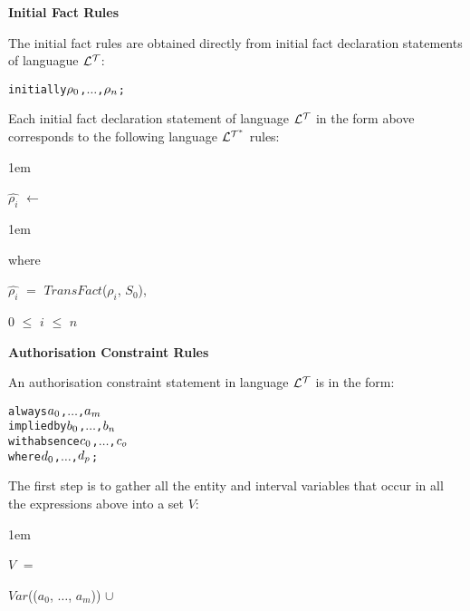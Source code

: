 \documentclass[11pt]{report}
\newenvironment{vverbatim}
{
  \begin{alltt}
}
{
  \vspace{-\baselineskip}
  \end{alltt}
}
\newenvironment{vquote}
{
  \begin{list}{}{\leftmargin 1em}\item[]
}
{
  \end{list}
}
\begin{document}
\begin{itemize}
            \item
              {\bf Initial Fact Rules}

              The initial fact rules are obtained directly from initial fact
              declaration statements of languague ${\cal L^T}$:

              \begin{vverbatim}
  initially \(\rho\sb{0}\), \(\ldots\), \(\rho\sb{n}\);
              \end{vverbatim}

              Each initial fact declaration statement of language ${\cal L^T}$
              in the form above corresponds to the following language
              ${\cal L^{T^*}}$ rules:

              \begin{vquote}
                $\hat{\rho_i}$ $\leftarrow$
              \end{vquote}

              \begin{vquote}
                where

                \hspace{1em}
                $\hat{\rho_i}$ $=$ $TransFact$($\rho_i$, $S_0$),

                \hspace{1em}
                $0$ $\leq$ $i$ $\leq$ $n$
              \end{vquote}

            \item
              {\bf Authorisation Constraint Rules}

              An authorisation constraint statement in language ${\cal L^T}$
              is in the form:

              \begin{vverbatim}
  always \(a\sb{0}\), \(\ldots\), \(a\sb{m}\)
    implied by \(b\sb{0}\), \(\ldots\), \(b\sb{n}\)
    with absence \(c\sb{0}\), \(\ldots\), \(c\sb{o}\)
    where \(d\sb{0}\), \(\ldots\), \(d\sb{p}\);
              \end{vverbatim}

              The first step is to gather all the entity and interval
              variables that occur in all the expressions above into a set $V$:

              \begin{vquote}
                $V$ $=$

                \hspace{1em}
                $Var$(($a_0$, $\ldots$, $a_m$)) $\cup$


\end{vquote}
\end{itemize}
\end{document}

